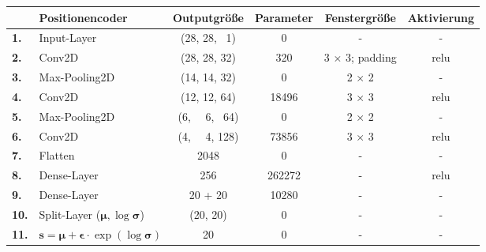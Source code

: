 \documentclass[12pt]{article}
\begin{document}
	\begin{table}[htb]
		\begin{center}
			\begin{tabular}{llcccc}\toprule
				\textbf{\ }	&\textbf{Positionencoder}	&\textbf{Outputgröße} &\textbf{Parameter} &\textbf{Fenstergröße} &\textbf{Aktivierung}\\
				\midrule
				\textbf{1.}	&Input-Layer	& (28, 28, \ 1)		& 0		& - 			&- \\
				\textbf{2.}	&Conv2D 		& (28, 28, 32)		& 320	& 3 $\times$ 3; padding	&relu \\
				\textbf{3.}	&Max-Pooling2D	& (14, 14, 32)		& 0		& 2 $\times$ 2	&- \\
				\textbf{4.}	&Conv2D			& (12, 12, 64)		& 18496	& 3 $\times$ 3	&relu \\
				\textbf{5.}	&Max-Pooling2D	& (6, \ \ 6, \ 64)	& 0		& 2 $\times$ 2 	&- \\
				\textbf{6.}	&Conv2D		& (4, \ \ 4,  128)	& 73856	& 3 $\times$ 3 	&relu \\
				\textbf{7.}	&Flatten		& 2048				& 0		& - 			&- \\
				\textbf{8.}	&Dense-Layer			& 256				& 262272	& - 			&relu \\
				\textbf{9.}	&Dense-Layer 			& 20 + 20				& 10280	& - 			&- \\
				\textbf{10.}	&Split-Layer	($\boldsymbol{\mu}, \log\boldsymbol{\sigma}$)	& (20, 20)				& 0	& - 			&- \\
				\textbf{11.}&$\mathbf{s}=\boldsymbol{\mu}+\boldsymbol{\epsilon}\cdot\exp(\log\boldsymbol{\sigma})$		& 20				& 0	& - 			&-\\
				\bottomrule
			\end{tabular}
		\end{center}
	\end{table}
\end{document}
